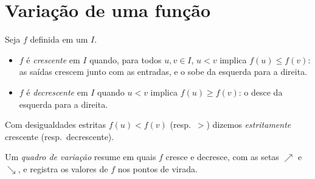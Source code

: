 \section{Variação de uma função}

\begin{definition}\label{def:g10:functions:variations}
Seja $f$ definida em um  $I$.
\begin{itemize}
  \item $f$ é \emph{crescente} em $I$ quando,
        para todos $u, v \in I$, $u < v$ implica $f(u) \leq f(v)$: as
        saídas crescem junto com as entradas, e o  sobe da
        esquerda para a direita.
  \item $f$ é \emph{decrescente} em $I$ quando
        $u < v$ implica $f(u) \geq f(v)$: o  desce da esquerda
        para a direita.
\end{itemize}
Com desigualdades estritas $f(u) < f(v)$ (resp.\ $>$) dizemos
\emph{estritamente} crescente (resp.\ decrescente).
\end{definition}

\begin{definition}\label{def:g10:functions:table}
Um \emph{quadro de variação} resume em quais
 $f$ cresce e decresce, com as setas $\nearrow$ e $\searrow$, e
registra os valores de $f$ nos pontos de virada.
\end{definition}

